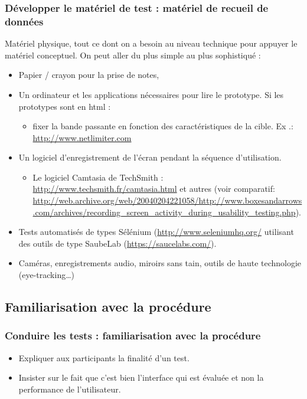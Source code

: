 		\begin{frame}[allowframebreaks]
		\frametitle{Développer le matériel de test : matériel de recueil de données}
		 Matériel physique, tout ce dont on a besoin au niveau technique pour appuyer le matériel conceptuel.
		 On peut aller du plus simple au plus sophistiqué : 
			\begin {itemize}
				      \item Papier / crayon pour la prise de notes,
				      \item  Un ordinateur et les applications nécessaires pour lire le prototype. Si les prototypes sont en html :
				      		\begin {itemize}
				      		\item fixer la bande passante en fonction des caractéristiques de la cible. Ex .: \url{http://www.netlimiter.com}
						\end{itemize}
				      
				      \item Un logiciel d'enregistrement de l'écran pendant la séquence d'utilisation. 
				      		\begin {itemize}
				      		\item Le logiciel Camtasia de TechSmith : \url{http://www.techsmith.fr/camtasia.html} et autres (voir comparatif: \url{http://web.archive.org/web/20040204221058/http://www.boxesandarrows.com/archives/recording_screen_activity_during_usability_testing.php}). 
						\end{itemize}
				      \item Tests automatisés de types Sélénium (\url{http://www.seleniumhq.org/} utilisant des outils de type SaubeLab (\url{https://saucelabs.com/}).
				   	\item Caméras, enregistrements audio, miroirs sans tain, outils de haute technologie (eye-tracking…) 
			\end{itemize}
		\end{frame}   	
	
	
		\subsection{Familiarisation avec la procédure} 
		
		\begin{frame}[allowframebreaks]
		\frametitle{Conduire les tests : familiarisation avec la procédure}
					\begin {itemize}
				      \item Expliquer aux participants la finalité d'un test. 
				      \item Insister sur le fait que c'est bien l'interface qui est évaluée et non la performance de l'utilisateur.
					\end{itemize}
		\end{frame}   	
		
